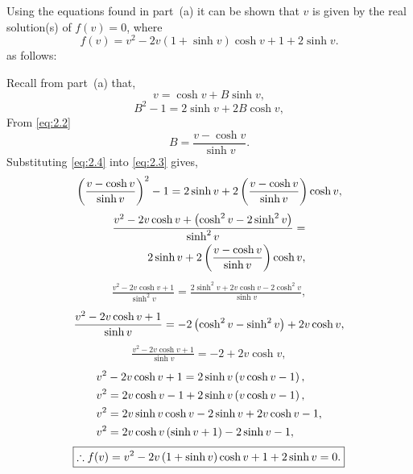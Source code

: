 Using the equations found in part~(a) it can be shown that $v$ is given by the real solution(s) of
$f (v) = 0$, where
\[f(v) = v^2 - 2v(1 + \sinh v) \cosh v + 1 + 2 \sinh v.\] as follows:

Recall from part~(a) that,
\begin{equation}
\label{eq:2.2}
	v = \cosh v + B \sinh v,
\end{equation}
\begin{equation}
\label{eq:2.3}
	B^2 - 1 = 2\sinh v + 2 B\cosh v,
\end{equation}
From \eqref{eq:2.2}
\begin{equation}
\label{eq:2.4}
	B = \frac{v-\cosh v}{\sinh v}.
\end{equation}
Substituting \eqref{eq:2.4} into \eqref{eq:2.3} gives,
\[
	\left(\frac{v-\cosh v}{\sinh v}\right)^2 - 1 = 2\sinh v + 2\left(\frac{v-\cosh v}{\sinh v}\right)\cosh v,
\]
\begin{align*}
	\frac{v^2 -2v \cosh v + \left(\cosh^2 v - 2\sinh^2 v\right)}{\sinh^2 v} =\\ 
	2\sinh v + 2\left(\frac{v-\cosh v}{\sinh v}\right)\cosh v,
\end{align*}
\begin{align*}
	\frac{v^2 -2v \cosh v + 1}{\sinh^2 v} =
	\frac{2\sinh^2 v + 2v\cosh v - 2\cosh^2v}{\sinh v},
\end{align*}
\begin{align*}
	\frac{v^2 -2v \cosh v + 1}{\sinh v} = -2\left(\cosh^2v -\sinh^2v\right) + 2v\cosh v,
\end{align*}
\begin{align*}
	\frac{v^2 -2v \cosh v + 1}{\sinh v} = -2 + 2v\cosh v,
\end{align*}
\begin{align*}
	{}&v^2 -2v \cosh v + 1 = 2\sinh v\left(v\cosh v - 1\right),\\
	{}&v^2 = 2v \cosh v - 1 + 2\sinh v\left(v\cosh v - 1\right),\\
	{}&v^2 = 2v\sinh v \cosh v - 2\sinh v + 2v\cosh v -1,\\
	{}&v^2 = 2v\cosh v\left(\sinh v + 1\right) - 2\sinh v -1,
\end{align*}
\begin{equation}
\label{eq:2.5}
	\boxed{\therefore f(v)=v^2 - 2v\left(1+\sinh v\right)\cosh v + 1 + 2\sinh v = 0.}
\end{equation}


	
